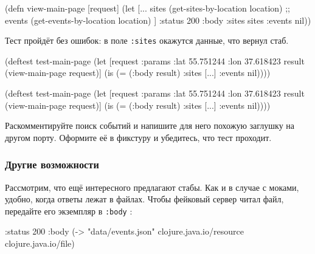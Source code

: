 \begin{english}
  \begin{clojure}
(defn view-main-page [request]
  (let [...
        sites (get-sites-by-location location)
        ;; events (get-events-by-location location)
       ]
    {:status 200
     :body {:sites sites :events nil}}))
  \end{clojure}
\end{english}

Тест пройдёт без ошибок: в поле \verb|:sites| окажутся данные, что вернул стаб.

\ifnarrow

\begin{english}
  \begin{clojure}
(deftest test-main-page
  (let [request
        {:params {:lat 55.751244
                  :lon 37.618423}}
        result (view-main-page request)]
    (is (= (:body result)
           {:sites [...] :events nil}))))
  \end{clojure}
\end{english}

\else

\begin{english}
  \begin{clojure}
(deftest test-main-page
  (let [request {:params {:lat 55.751244
                          :lon 37.618423}}
        result (view-main-page request)]
    (is (= (:body result) {:sites [...] :events nil}))))
  \end{clojure}
\end{english}

\fi

Раскомментируйте поиск событий и напишите для него похожую заглушку на другом
порту. Оформите её в фикстуру и убедитесь, что тест проходит.

\subsubsection*{Другие возможности}

Рассмотрим, что ещё интересного предлагают стабы. Как и в случае с моками,
удобно, когда ответы лежат в файлах. Чтобы фейковый сервер читал файл, передайте
его экземпляр в \verb|:body| :


\begin{english}
  \begin{clojure}
{:status 200
 :body (-> "data/events.json"
           clojure.java.io/resource
           clojure.java.io/file)}
  \end{clojure}
\end{english}

